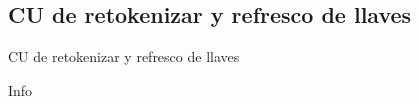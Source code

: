 %
%
%

\subsection{CU de retokenizar y refresco de llaves}

\begin{frame}{CU de retokenizar y refresco de llaves}
  
  Info


\end{frame}
